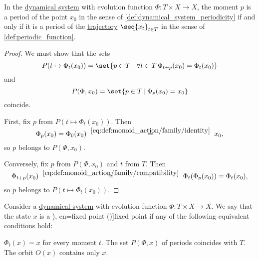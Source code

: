 \begin{proposition}\label{thm:dynamical_system_trajectory_period}
  In the \hyperref[def:dynamical_system]{dynamical system} with evolution function \( \Phi: T \times X \to X \), the moment \( p \) is a period of the point \( x_0 \) in the sense of \cref{def:dynamical_system_periodicity} if and only if it is a period of the \hyperref[def:dynamical_system_trajectory]{trajectory} \( \seq{ x_t }_{t \in T} \) in the sense of \cref{def:periodic_function}.
\end{proposition}
\begin{proof}
  We must show that the sets
  \begin{equation*}
    P(t \mapsto \Phi_t(x_0)) = \set{ p \in T \given \qforall* {t \in T} \Phi_{t + p}(x_0) = \Phi_t(x_0) }
  \end{equation*}
  and
  \begin{equation*}
    P(\Phi, x_0) = \set{ p \in T \given \Phi_p(x_0) = x_0 }
  \end{equation*}
  coincide.

  First, fix \( p \) from \( P(t \mapsto \Phi_t(x_0)) \). Then
  \begin{equation*}
    \Phi_p(x_0)
    =
    \Phi_0(x_0)
    \reloset {\ref{eq:def:monoid_action/family/identity}} =
    x_0,
  \end{equation*}
  so \( p \) belongs to \( P(\Phi, x_0) \).

  Conversely, fix \( p \) from \( P(\Phi, x_0) \) and \( t \) from \( T \). Then
  \begin{equation*}
    \Phi_{t + p}(x_0)
    \reloset {\ref{eq:def:monoid_action/family/compatibility}} =
    \Phi_t(\Phi_p(x_0))
    =
    \Phi_t(x_0),
  \end{equation*}
  so \( p \) belongs to \( P(t \mapsto \Phi_t(x_0)) \).
\end{proof}

\begin{definition}\label{def:dynamical_system_fixed_point}
  Consider a \hyperref[def:dynamical_system]{dynamical system} with evolution function \( \Phi: T \times X \to X \). We say that the state \( x \) is a \term[ru=неподвижная точка (\cite[39]{Юмагулов2015ДинамическиеСистемы}), en=fixed point (\cite[2]{BrinStuck2002DynamicalSystems})]{fixed point} if any of the following equivalent conditions hold:

  \begin{thmenum}
     \( \Phi_t(x) = x \) for every moment \( t \).
    \mimprovised The set \( P(\Phi, x) \) of periods coincides with \( T \).
     The orbit \( O(x) \) contains only \( x \).
  \end{thmenum}
\end{definition}


